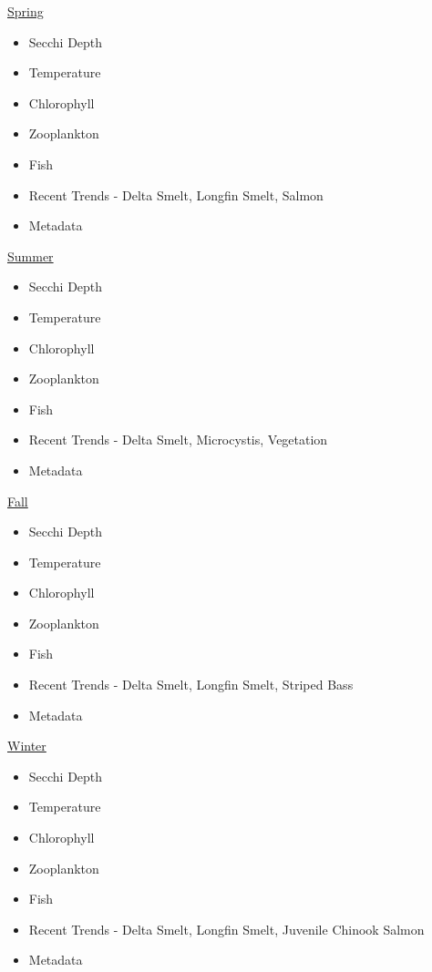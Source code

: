 \documentclass[
]{book}
\providecommand{\tightlist}{%
  \setlength{\itemsep}{0pt}\setlength{\parskip}{0pt}}
\begin{document}
\href{Spring.html}{Spring}

\begin{itemize}
\tightlist
\item
  Secchi Depth
\item
  Temperature
\item
  Chlorophyll
\item
  Zooplankton
\item
  Fish
\item
  Recent Trends - Delta Smelt, Longfin Smelt, Salmon
\item
  Metadata
\end{itemize}

\href{Summer.html}{Summer}

\begin{itemize}
\tightlist
\item
  Secchi Depth
\item
  Temperature
\item
  Chlorophyll
\item
  Zooplankton
\item
  Fish
\item
  Recent Trends - Delta Smelt, Microcystis, Vegetation
\item
  Metadata
\end{itemize}

\href{Fall.html}{Fall}

\begin{itemize}
\tightlist
\item
  Secchi Depth
\item
  Temperature
\item
  Chlorophyll
\item
  Zooplankton
\item
  Fish
\item
  Recent Trends - Delta Smelt, Longfin Smelt, Striped Bass
\item
  Metadata
\end{itemize}

\href{Winter.html}{Winter}

\begin{itemize}
\tightlist
\item
  Secchi Depth
\item
  Temperature
\item
  Chlorophyll
\item
  Zooplankton
\item
  Fish
\item
  Recent Trends - Delta Smelt, Longfin Smelt, Juvenile Chinook Salmon
\item
  Metadata
\end{itemize}
\end{document}
